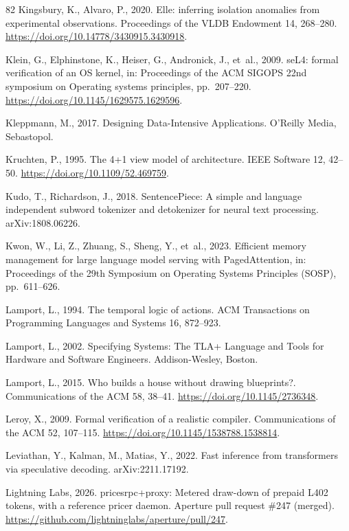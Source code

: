 \documentclass[preprint,3p,authoryear,12pt]{elsarticle}
\begin{document}
\begin{thebibliography}{82}
Kingsbury, K., Alvaro, P., 2020. Elle: inferring isolation anomalies from experimental observations. Proceedings of the VLDB Endowment 14, 268--280. \url{https://doi.org/10.14778/3430915.3430918}.

Klein, G., Elphinstone, K., Heiser, G., Andronick, J., et~al., 2009. seL4: formal verification of an OS kernel, in: Proceedings of the ACM SIGOPS 22nd symposium on Operating systems principles, pp.~207--220. \url{https://doi.org/10.1145/1629575.1629596}.

Kleppmann, M., 2017. Designing Data-Intensive Applications. O'Reilly Media, Sebastopol.

Kruchten, P., 1995. The 4+1 view model of architecture. IEEE Software 12, 42--50. \url{https://doi.org/10.1109/52.469759}.

Kudo, T., Richardson, J., 2018. SentencePiece: A simple and language independent
subword tokenizer and detokenizer for neural text processing. arXiv:1808.06226.

Kwon, W., Li, Z., Zhuang, S., Sheng, Y., et~al., 2023. Efficient memory management for
large language model serving with PagedAttention, in: Proceedings of the 29th Symposium
on Operating Systems Principles (SOSP), pp.~611--626.

Lamport, L., 1994. The temporal logic of actions. ACM Transactions on Programming
Languages and Systems 16, 872--923.

Lamport, L., 2002. Specifying Systems: The TLA+ Language and Tools for Hardware and Software Engineers. Addison-Wesley, Boston.

Lamport, L., 2015. Who builds a house without drawing blueprints?. Communications of the ACM 58, 38--41. \url{https://doi.org/10.1145/2736348}.

Leroy, X., 2009. Formal verification of a realistic compiler. Communications of the ACM 52, 107--115. \url{https://doi.org/10.1145/1538788.1538814}.

Leviathan, Y., Kalman, M., Matias, Y., 2022. Fast inference from transformers via speculative decoding. arXiv:2211.17192.

Lightning Labs, 2026. pricesrpc+proxy: Metered draw-down of prepaid L402 tokens, with a
reference pricer daemon. Aperture pull request \#247 (merged).
\url{https://github.com/lightninglabs/aperture/pull/247}.


\end{thebibliography}
\end{document}
